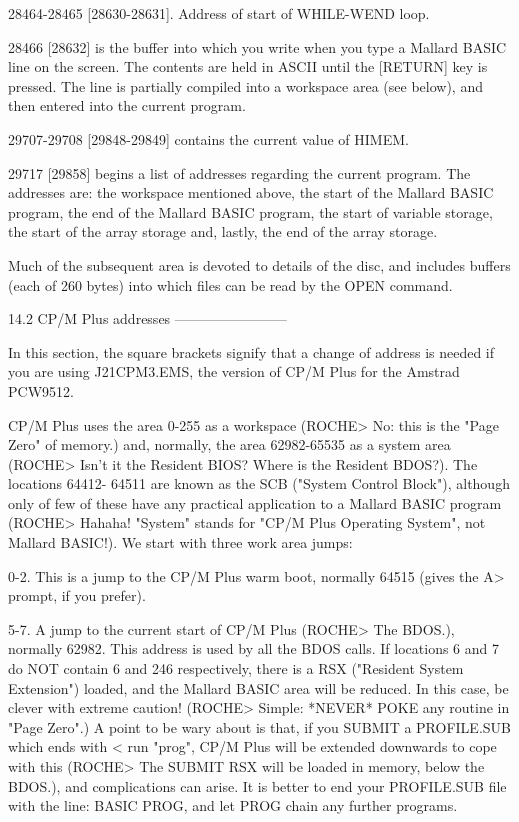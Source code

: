 28464-28465 [28630-28631]. Address of start of WHILE-WEND loop.

28466 [28632] is the buffer into which you write when you type a Mallard BASIC 
line  on the screen. The contents are held in ASCII until the [RETURN] key  is 
pressed. The line is partially compiled into a workspace area (see below), and 
then entered into the current program.

29707-29708 [29848-29849] contains the current value of HIMEM.

29717  [29858] begins a list of addresses regarding the current  program.  The 
addresses  are: the workspace mentioned above, the start of the Mallard  BASIC 
program, the end of the Mallard BASIC program, the start of variable  storage, 
the start of the array storage and, lastly, the end of the array storage.

Much  of the subsequent area is devoted to details of the disc,  and  includes 
buffers (each of 260 bytes) into which files can be read by the OPEN command.


14.2 CP/M Plus addresses
------------------------

In  this  section,  the square brackets signify that a change  of  address  is 
needed if you are using J21CPM3.EMS, the version of CP/M Plus for the  Amstrad 
PCW9512.

CP/M  Plus  uses the area 0-255 as a workspace (ROCHE> No: this is  the  "Page 
Zero" of memory.) and, normally, the area 62982-65535 as a system area (ROCHE> 
Isn't it the Resident BIOS? Where is the Resident BDOS?). The locations 64412-
64511  are known as the SCB ("System Control Block"), although only of few  of 
these  have  any  practical application to a  Mallard  BASIC  program  (ROCHE> 
Hahaha! "System" stands for "CP/M Plus Operating System", not Mallard BASIC!). 
We start with three work area jumps:

0-2.  This is a jump to the CP/M Plus warm boot, normally 64515 (gives the  A> 
prompt, if you prefer).

5-7.  A  jump to the current start of CP/M Plus (ROCHE> The  BDOS.),  normally 
62982. This address is used by all the BDOS calls. If locations 6 and 7 do NOT 
contain  6 and 246 respectively, there is a RSX ("Resident System  Extension") 
loaded,  and the Mallard BASIC area will be reduced. In this case,  be  clever 
with  extreme  caution!  (ROCHE> Simple: *NEVER* POKE  any  routine  in  "Page 
Zero".)  A point to be wary about is that, if you SUBMIT a  PROFILE.SUB  which 
ends with < run "prog", CP/M Plus will be extended downwards to cope with this 
(ROCHE>  The  SUBMIT  RSX  will be loaded in memory,  below  the  BDOS.),  and 
complications  can arise. It is better to end your PROFILE.SUB file  with  the 
line: BASIC PROG, and let PROG chain any further programs.

